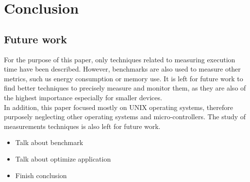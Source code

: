 \chapter{Conclusion}

\section{Future work}
For the purpose of this paper, only techniques related to measuring execution time have been described. However, benchmarks are also used to measure other metrics, such us energy consumption or memory use. It is left for future work to find better techniques to precisely measure and monitor them, as they are also of the highest importance especially for smaller devices. \\
In addition, this paper focused mostly on UNIX operating systems, therefore purposely neglecting other operating systems and micro-controllers. The study of measurements techniques is also left for future work. 
\begin{itemize}
\item Talk about benchmark
\item Talk about optimize application
\item Finish conclusion
\end{itemize}

